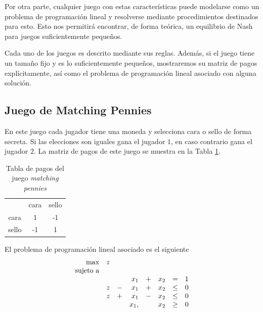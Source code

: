 Por otra parte, cualquier juego con estas características puede modelarse como un problema de programación lineal \cite[pp.~228-233]{bib:pl-chvatal} y resolverse mediante procedimientos destinados para esto. Esto nos permitirá encontrar, de forma teórica, un equilibrio de Nash para juegos suficientemente pequeños.

Cada uno de los juegos es descrito mediante sus reglas. Además, si el juego tiene un tamaño fijo y es lo suficientemente pequeños, mostraremos su matriz de pagos explícitamente, así como el problema de programación lineal asociado con alguna solución.

\subsection*{Juego de Matching Pennies}

En este juego cada jugador tiene una moneda y selecciona cara o sello de forma secreta. Si las elecciones son iguales gana el jugador $1$, en caso contrario gana el jugador $2$. La matriz de pagos de este juego se muestra en la Tabla \ref{table:pagos-matching-pennies}.

\begin{table}[ht]
\begin{center}
\caption[Tabla de pagos del juego matching pennies]{Tabla de pagos del juego \textit{matching pennies}}
\label{table:pagos-matching-pennies}
\begin{tabular}{ c | c | c |}
 \multicolumn{1}{c}{} & \multicolumn{1}{c}{cara} & \multicolumn{1}{c}{sello}  \\ \cline{2-3}
 cara  &  1 & -1 \\ \cline{2-3}
 sello & -1 &  1 \\ \cline{2-3}
\end{tabular}
\end{center}
\end{table}

El problema de programación lineal asociado es el siguiente
\begin{equation}
\begin{array}{r r r r r r r r}
\max  & z &  & & & & &\\
\text{sujeto a} \\  
&   &   & x_1  & + & x_2 & = & 1 \\
& z & - & x_1  & + & x_2 & \leq & 0 \\
& z & + & x_1  & - & x_2 & \leq & 0 \\
&   &   & x_1, &   & x_2 & \geq & 0
\end{array}
\end{equation}

